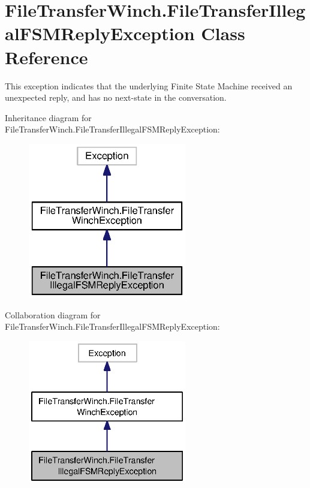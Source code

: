\section{File\+Transfer\+Winch.\+File\+Transfer\+Illegal\+F\+S\+M\+Reply\+Exception Class Reference}
\label{classorg_1_1smallfoot_1_1filexfer_1_1FileTransferWinch_1_1FileTransferIllegalFSMReplyException}


This exception indicates that the underlying Finite State Machine received an unexpected reply, and has no next-\/state in the conversation.  




Inheritance diagram for File\+Transfer\+Winch.\+File\+Transfer\+Illegal\+F\+S\+M\+Reply\+Exception\+:\nopagebreak
\begin{figure}[H]
\begin{center}
\leavevmode
\includegraphics[width=196pt]{classorg_1_1smallfoot_1_1filexfer_1_1FileTransferWinch_1_1FileTransferIllegalFSMReplyException__inherit__graph}
\end{center}
\end{figure}


Collaboration diagram for File\+Transfer\+Winch.\+File\+Transfer\+Illegal\+F\+S\+M\+Reply\+Exception\+:\nopagebreak
\begin{figure}[H]
\begin{center}
\leavevmode
\includegraphics[width=196pt]{classorg_1_1smallfoot_1_1filexfer_1_1FileTransferWinch_1_1FileTransferIllegalFSMReplyException__coll__graph}
\end{center}
\end{figure}
